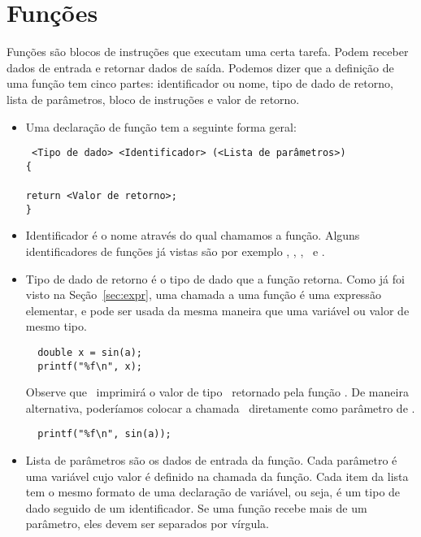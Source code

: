 
\chapter{Funções}

Funções são blocos de instruções que executam uma certa tarefa. 
Podem receber dados de entrada e retornar dados de saída. 
Podemos dizer que a definição de uma função tem cinco partes: identificador ou nome, tipo de dado de retorno, lista de parâmetros, bloco de instruções e valor de retorno.

\begin{itemize}

\item Uma declaração de função tem a seguinte forma geral:

{\tt
<Tipo de dado> <Identificador> (<Lista de parâmetros>)\\
\{\\
\\
\TAB return <Valor de retorno>;\\
\}\\
}

\item Identificador é o nome através do qual chamamos a função. Alguns identificadores de funções já vistas são por exemplo \PRINTF, \SCANF, \FGETS, \SIN\ e \COS.

\item Tipo de dado de retorno é o tipo de dado que a função retorna. Como já foi visto na Seção~\ref{sec:expr}, uma chamada a uma função é uma expressão elementar, e pode ser usada da mesma maneira que uma variável ou valor de mesmo tipo.

\begin{lstlisting}
  double x = sin(a);
  printf("%f\n", x);
\end{lstlisting}

  Observe que \PRINTF\ imprimirá o valor de tipo \DOUBLE\ retornado pela função \SIN. De maneira alternativa, poderíamos colocar a chamada \SIN\ diretamente como parâmetro de \PRINTF.

\begin{lstlisting}
  printf("%f\n", sin(a));
\end{lstlisting}

\item Lista de parâmetros são os dados de entrada da função. Cada parâmetro é uma variável cujo valor é definido na chamada da função. Cada item da lista tem o mesmo formato de uma declaração de variável, ou seja, é um tipo de dado seguido de um identificador. Se uma função recebe mais de um parâmetro, eles devem ser separados por vírgula.


\end{itemize}
